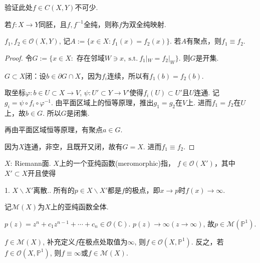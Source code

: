 \begin{remark}
	验证此处$f\in C(X,Y)$不可少. 
\end{remark}
		
\begin{definition}
	若$f:X\rightarrow Y$同胚，且$f, f^{-1}$全纯，则称$f$为双全纯映射.
\end{definition}
		
\begin{proposition}[恒等原理]
	$f_1, f_2\in \mathcal{O}(X,Y)$, 记$A:=\{x\in X: f_1(x)=f_2(x)\}$. 
    若$A$有聚点，则$f_1\equiv f_2$.
\end{proposition}
		
\begin{proof}
	令$G:=\{x\in X:$ 存在邻域$W\ni x,\ \text{s.t.}\ f_1|_W=f_2|_W\}$. 则$G$是开集.

	$G\subset X$闭：设$b\in \partial G\cap X$，因为$f_i$连续，所以有$f_1(b)=f_2(b)$.

	取坐标$\varphi\colon b\in U\subset X\rightarrow V$, 
    $\psi\colon U'\subset Y\rightarrow V'$使得$f_i(U)\subset U'$且$U$连通. 
    记$g_i=\psi\circ f_i\circ \varphi^{-1}$. 
    由平面区域上的恒等原理，推出$g_1=g_2$在$V$上. 进而$f_1=f_2$在$U$上，故$b\in G$. 
    所以$G$是闭集.

    再由平面区域恒等原理，有聚点$a\in G$.

	因为$X$连通，非空，且既开又闭，故有$G=X$. 进而$f_1\equiv f_2$.
\end{proof}
	
\begin{definition}
	$X$: Riemann面. $X$上的一个亚纯函数(meromorphic)指，
    $f\in \mathcal{O}(X')$，其中$X'\subset X$开且使得

	1. $X\backslash X'$离散.. 所有的$p\in X\backslash X'$都是$f$的极点，即$x\to p$时$f(x)\to \infty$.

	记$\mathscr{M}(X)$为$X$上的亚纯函数全体.
\end{definition}
		
\begin{example}
	$p(z)=z^n+c_1z^{n-1}+\cdots+c_n\in \mathcal{O}(\mathbb{C})$. 
    $p(z)\to \infty(z\to \infty)$, 故$p\in \mathscr{M}(\mathbb{P}^1)$.
\end{example}

\begin{theorem}
	$f\in \mathscr{M}(X)$, 补充定义$f$在极点处取值为$\infty$, 
    则$f\in \mathcal{O}(X,\mathbb{P}^1)$. 
    反之，若$f\in \mathcal{O}(X,\mathbb{P}^1)$, 
    则$f\equiv \infty$或$f\in \mathscr{M}(X)$.
\end{theorem}
		
